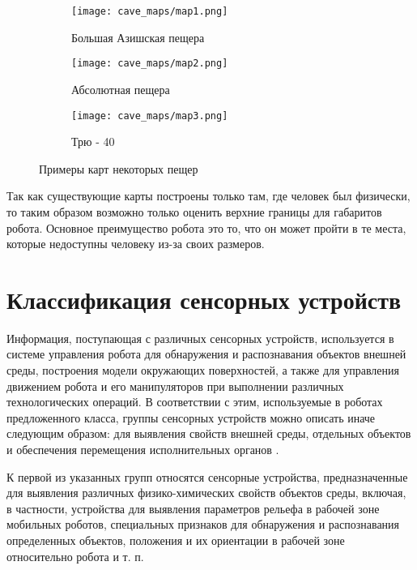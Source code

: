 \begin{figure}[H]
\begin{subfigure}{0.8\textwidth}
\centering\texttt{[image: cave\_maps/map1.png]}\\
\caption{Большая Азишская пещера}
\label{fig:ice}
\end{subfigure}

\begin{subfigure}{0.8\textwidth}
\centering\texttt{[image: cave\_maps/map2.png]}\\
\caption{Абсолютная пещера}
\end{subfigure}

\begin{subfigure}{0.8\textwidth}
\centering\texttt{[image: cave\_maps/map3.png]}\\
\caption{Трю - 40}
\end{subfigure}
\caption{Примеры карт некоторых пещер}
\end{figure}

Так как существующие карты построены только там, где человек был физически, то таким образом возможно только оценить верхние границы для габаритов робота. Основное преимущество робота это то, что он может пройти в те места, которые недоступны человеку из-за своих размеров.


\section{Классификация сенсорных устройств}
Информация, поступающая с различных сенсорных устройств, используется в системе управления робота для обнаружения и распознавания объектов внешней среды, построения модели окружающих поверхностей, а также для управления движением робота и его манипуляторов при выполнении различных технологических операций. В соответствии с этим, используемые в роботах предложенного класса, группы сенсорных устройств можно описать иначе следующим образом: для выявления свойств внешней среды, отдельных объектов и обеспечения перемещения исполнительных органов \cite{2013,1984,2015}.

К первой из указанных групп относятся сенсорные устройства, предназначенные для выявления различных физико-химических свойств объектов среды, включая, в частности, устройства для выявления параметров рельефа в рабочей зоне мобильных роботов, специальных признаков для обнаружения и распознавания определенных объектов, положения и их ориентации в рабочей зоне относительно робота и т. п.


